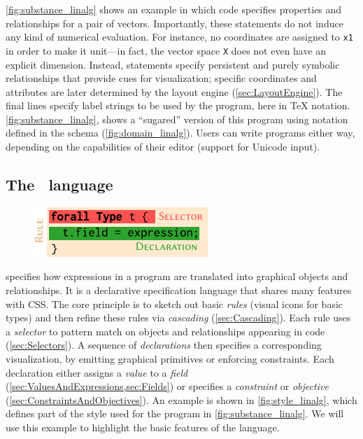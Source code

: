\cref{fig:substance_linalg} shows an example in which \Substance{} code specifies properties and relationships for a pair of vectors.  Importantly, these statements do not induce any kind of numerical evaluation.  For instance, no coordinates are assigned to \texttt{x1} in order to make it unit---in fact, the vector space \texttt{X} does not even have an explicit dimension.  Instead, statements specify persistent and purely symbolic relationships that provide cues for visualization;  specific coordinates and attributes are later determined by the layout engine (\cref{sec:LayoutEngine}). The final lines specify label strings to be used by the \Style{} program, here in \TeX{} notation.  \cref{fig:substance_linalg},  shows a ``sugared'' version of this program using notation defined in the \Domain{} schema (\cref{fig:domain_linalg}).  Users can write programs either way, depending on the capabilities of their editor (\eg support for Unicode input).


\subsection{The \Style\ language}
\label{sec:TheStyleLanguage}



\setlength{\columnsep}{1em}
\setlength{\intextsep}{1em}
\begin{figure}
   \includegraphics[width=\linewidth]{assets/penrose/StyleNomenclature.pdf}
\end{figure}
\Style{} specifies how expressions in a \Substance{} program are translated into graphical objects and relationships.  It is a declarative specification language that shares many features with CSS.  The core principle is to sketch out basic \emph{rules} (\eg visual icons for basic types) and then refine these rules via \emph{cascading} (\cref{sec:Cascading}).  Each rule uses a \emph{selector} to pattern match on objects and relationships appearing in \Substance{} code (\cref{sec:Selectors}).  A sequence of \emph{declarations} then specifies a corresponding visualization, \eg by emitting graphical primitives or enforcing constraints.  Each declaration either assigns a \emph{value} to a \emph{field} (\cref{sec:ValuesAndExpressions,sec:Fields}) or specifies a \emph{constraint} or \emph{objective} (\cref{sec:ConstraintsAndObjectives}).  An example is shown in \cref{fig:style_linalg}, which defines part of the style used for the \Substance{} program in \cref{fig:substance_linalg}.  We will use this example to highlight the basic features of the language.  

